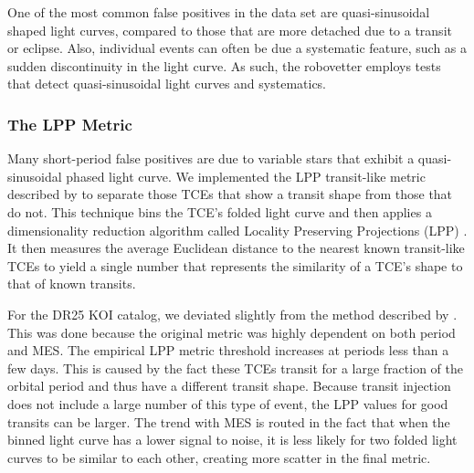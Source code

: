 One of the most common false positives in the data set are quasi-sinusoidal shaped light curves, compared to those that are more detached due to a transit or eclipse. Also, individual events can often be due a systematic feature, such as a sudden discontinuity in the light curve. As such, the robovetter employs tests that detect quasi-sinusoidal light curves and systematics.


\subsubsection{The LPP Metric}
\label{s:lpp}

Many short-period false positives are due to variable stars that exhibit a quasi-sinusoidal phased light curve. We implemented the LPP transit-like metric described by \citet{Thompson2015b} to separate those TCEs that show a transit shape from those that do not. This technique bins the TCE's folded light curve and then applies a dimensionality reduction algorithm called Locality Preserving Projections (LPP) \citep{He2004}.  It then measures the average Euclidean distance to the nearest known transit-like TCEs to yield a single number that represents the similarity of a TCE's shape to that of known transits. 

For the DR25 KOI catalog, we deviated slightly from the method described by \citet{Thompson2015b}.  This was done because the original metric was highly dependent on both period and MES. The empirical LPP metric threshold increases at periods less than a few days. This is caused by the fact these TCEs transit for a large fraction of the orbital period and thus have a different transit shape. Because transit injection does not include a large number of this type of event, the LPP values for good transits can be larger. The trend with MES is routed in the fact that when the binned light curve has a lower signal to noise, it is less likely for two folded light curves to be similar to each other, creating more scatter in the final metric. 

